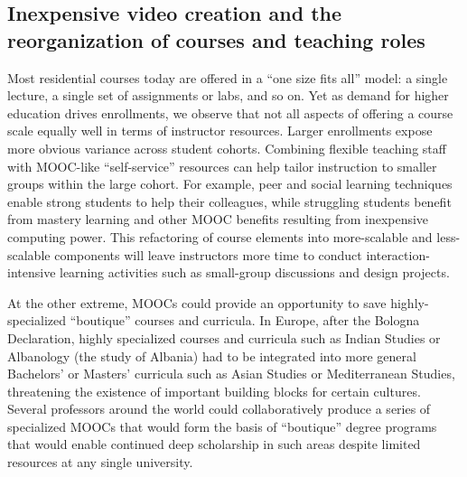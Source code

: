 \subsection{Inexpensive video creation and the reorganization of courses
  and teaching roles}

Most residential courses today are offered in a ``one size fits all''
model: a single lecture, a single set of assignments or labs, and so on.
Yet as demand for higher education drives enrollments, we observe that
not all aspects of offering a course scale equally well in terms of
instructor resources.
Larger enrollments expose more obvious variance across student cohorts.
Combining flexible teaching staff with MOOC-like ``self-service''
resources can help tailor instruction to smaller groups within the large
cohort.   For example, peer and social learning techniques enable
strong students to help their colleagues, while struggling students 
benefit from mastery learning and other MOOC benefits resulting from
inexpensive computing power.
This refactoring of course elements into more-scalable and less-scalable
components
will leave instructors more time to conduct
interaction-intensive learning activities such as small-group 
discussions and design projects.

At the other extreme, MOOCs could provide an opportunity to save
highly-specialized ``boutique'' courses and curricula.
In Europe, after the Bologna Declaration, highly specialized courses and
curricula such as Indian Studies or Albanology (the study of Albania)
had to be integrated into more general Bachelors' or Masters' curricula
such as Asian Studies or Mediterranean Studies, threatening the
existence of important building blocks for certain cultures.
Several professors around the world could collaboratively produce a
series of specialized MOOCs that would form the basis of ``boutique''
degree programs that would enable continued deep scholarship in such
areas despite limited resources at any single university.

